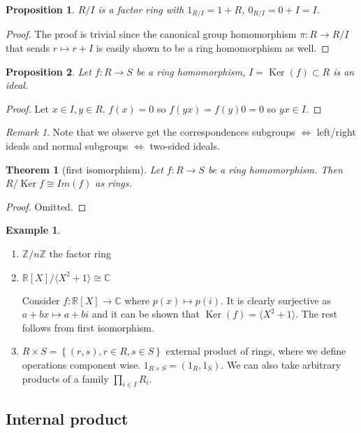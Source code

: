 \documentclass{article}
\newcommand\R{\ensuremath{\mathbb{R}}}
\newcommand\Z{\ensuremath{\mathbb{Z}}}
\newcommand\C{\ensuremath{\mathbb{C}}}
\DeclareMathOperator{\Ker}{Ker}
\newtheorem{theorem}{Theorem}[section]
\theoremstyle{definition}
\newtheorem{eg}{Example}[subsection]
\theoremstyle{remark}
\newtheorem*{remark}{Remark}
\theoremstyle{plain}
\newtheorem{prop}{Proposition}[subsection]
\begin{document}
\begin{prop}
    $R/I$ is a factor ring with $1_{R/I} = 1 + R$, $0_{R/I} = 0 + I = I$.
\end{prop}
\begin{proof}
    The proof is trivial since the canonical group homomorphism $\pi: R \to R/I$ that sends $r \mapsto r + I$ is easily shown to be a ring homomorphism as well. 
\end{proof}

\begin{prop}
    Let $f: R \to S$ be a ring homomorphism, $I = \Ker(f)\subset R$ is an ideal.
\end{prop}
\begin{proof}
    Let $x\in I, y \in R$. $f(x) = 0$ so $f(yx) = f(y)0 = 0$ so $yx \in I$.
\end{proof}

\begin{remark}
    Note that we observe get the correspondences subgroups $\iff$ left/right ideals and normal subgroups $\iff$ two-sided ideals.
\end{remark}

\begin{theorem}[first isomorphism]
    Let $f: R \to S$ be a ring homomorphism. Then $R/\Ker{f} \cong Im(f)$ as rings. 
\end{theorem}
\begin{proof}
    Omitted.
\end{proof}

\begin{eg}
    \begin{enumerate}
        \item $\Z/n\Z$ the factor ring
        \item $\R[X]/\langle X^2+1 \rangle \cong \C$
        
        Consider $f: \R[X] \to \C$ where $p(x) \mapsto p(i)$. It is clearly surjective as $a+bx \mapsto a+bi$ and it can be shown that $\Ker(f) = \langle X^2+1 \rangle$. The rest follows from first isomorphism.
        \item $R \times S = \left\{ (r,s), r\in R, s\in S \right\}$ external product of rings, where we define operations component wise. $1_{R\times S} = (1_R, 1_S)$. We can also take arbitrary products of a family $\prod_{i \in I}R_i$.
    \end{enumerate}
\end{eg}

\subsection{Internal product}
\end{document}
